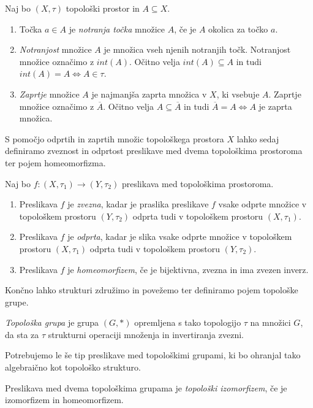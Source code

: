 \documentclass[mat1]{fmfdelo}
\newcommand{\closure}[1]{\overline{#1}}
\begin{document}
\begin{definicija}\label{def:notranjost}
Naj bo $(X, \tau)$ topološki prostor in $A \subseteq X$.
\begin{enumerate}
\item Točka $a \in A$ je \emph{notranja točka} množice $A$, če je $A$ okolica za točko $a$.
\item \emph{Notranjost} množice $A$ je množica vseh njenih notranjih točk. Notranjost množice označimo z $int(A)$. Očitno velja $int(A) \subseteq A$ in tudi $int(A) = A \iff A \in \tau$.
\item \emph{Zaprtje} množice $A$ je najmanjša zaprta množica v $X$, ki vsebuje $A$. Zaprtje množice označimo z $\closure{A}$. Očitno velja $A \subseteq \closure{A}$ in tudi $\closure{A} = A \iff A$ je zaprta množica.
\end{enumerate}
\end{definicija}

S pomočjo odprtih in zaprtih množic topološkega prostora $X$ lahko sedaj definiramo zveznost in odprtost preslikave med dvema topološkima prostoroma ter pojem homeomorfizma.

\begin{definicija}\label{def:toppreslikave}
Naj bo $f: (X, \tau_1) \to (Y, \tau_2)$ preslikava med topološkima prostoroma.
\begin{enumerate}
\item Preslikava $f$ je \emph{zvezna}, kadar je praslika preslikave $f$ vsake odprte množice v topološkem prostoru $(Y, \tau_2)$ odprta tudi v topološkem prostoru $(X, \tau_1)$.
\item Preslikava $f$ je \emph{odprta}, kadar je slika vsake odprte množice v topološkem prostoru $(X, \tau_1)$ odprta tudi v topološkem prostoru $(Y, \tau_2)$.
\item Preslikava $f$ je \emph{homeomorfizem}, če je bijektivna, zvezna in ima zvezen inverz.
\end{enumerate}
\end{definicija}

Končno lahko strukturi združimo in povežemo ter definiramo pojem topološke grupe.
\begin{definicija}\label{def:topgrupa}
\emph{Topološka grupa} je grupa $(G, *)$ opremljena s tako topologijo $\tau$ na množici $G$, da sta za $\tau$ strukturni operaciji množenja in invertiranja zvezni. 
\end{definicija}

Potrebujemo le še tip preslikave med topološkimi grupami, ki bo ohranjal tako algebraično kot topološko strukturo.
\begin{definicija}\label{def:topizo}
Preslikava med dvema topološkima grupama je \emph{topološki izomorfizem}, če je izomorfizem in homeomorfizem.
\end{definicija}
\end{document}
